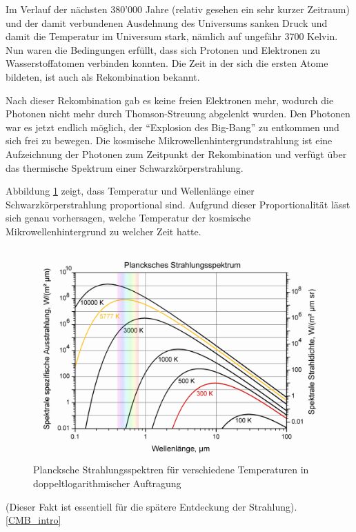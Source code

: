 Im Verlauf der nächsten 380'000 Jahre (relativ gesehen ein sehr kurzer Zeitraum) und der damit verbundenen Ausdehnung des 
Universums sanken Druck und damit die Temperatur im Universum stark, nämlich auf ungefähr 3700 
Kelvin.
Nun waren die Bedingungen erfüllt, dass sich Protonen und Elektronen zu 
Wasserstoffatomen verbinden konnten.
Die Zeit in der sich die ersten Atome bildeten, ist auch als Rekombination bekannt.


Nach dieser Rekombination gab es keine freien Elektronen mehr, wodurch die 
Photonen nicht mehr durch Thomson-Streuung abgelenkt wurden.
Den Photonen war es jetzt endlich möglich, der ``Explosion des Big-Bang'' zu 
entkommen und sich frei zu bewegen.
Die kosmische Mikrowellenhintergrundstrahlung ist eine Aufzeichnung der Photonen zum 
Zeitpunkt der Rekombination und verfügt über das thermische Spektrum einer Schwarzkörperstrahlung.

Abbildung \ref{fig:blackbody_spectrum} zeigt, dass Temperatur und Wellenlänge einer Schwarzkörperstrahlung proportional sind.
Aufgrund dieser Proportionalität lässt sich genau vorhersagen, welche Temperatur der kosmische Mikrowellenhintergrund zu welcher Zeit hatte.
\begin{figure}
	\centering
	\includegraphics[width=\linewidth]{cmb/images/blackbody_spectrum.png}
	\caption{Plancksche Strahlungsspektren für verschiedene Temperaturen in doppeltlogarithmischer Auftragung}
	\label{fig:blackbody_spectrum}
\end{figure}
(Dieser Fakt ist essentiell für die spätere Entdeckung der Strahlung).
\ref{CMB_intro}

